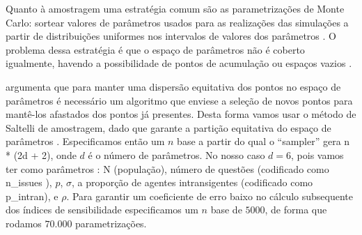 Quanto à amostragem uma estratégia comum são as parametrizações de Monte Carlo:
sortear valores de parâmetros usados para as realizações das simulações a partir
de distribuições uniformes nos intervalos de valores dos parâmetros
\cite{laver2011party}. O problema dessa estratégia é que o espaço de parâmetros
não é coberto igualmente, havendo a possibilidade de pontos de acumulação ou
espaços vazios \cite{pereda2017brief}.

 argumenta que para manter uma dispersão
equitativa dos pontos no espaço de parâmetros é necessário um algoritmo que
enviese a seleção de novos pontos para mantê-los afastados dos pontos já
presentes. Desta forma vamos usar o método de Saltelli de amostragem, dado que
garante a partição equitativa do espaço de parâmetros \cite{herman2017salib}.
Especificamos então um \(n\) base a partir do qual o ``sampler'' gera n * (2d +
2), onde \(d\) é o número de parâmetros. No nosso caso \(d = 6\), pois vamos ter
como parâmetros : N (população), número de questões (codificado como n\_issues
), \(p\), \(\sigma\), a proporção de agentes intransigentes (codificado como
p\_intran), e \(\rho\). Para garantir um coeficiente de erro baixo no cálculo
subsequente dos índices de sensibilidade especificamos um \(n\) base de
\(5000\), de forma que rodamos \(70.000\) parametrizações.


